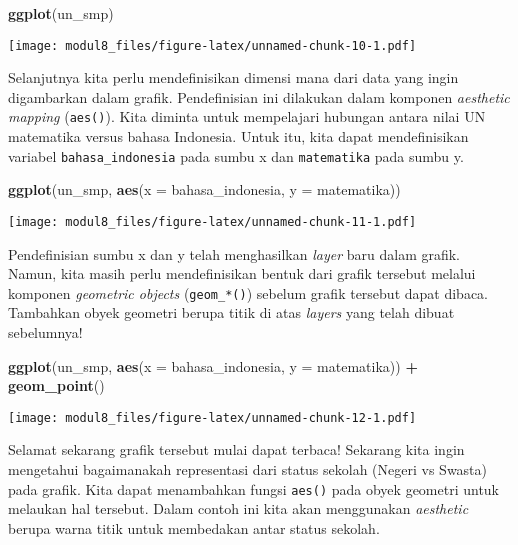 \documentclass[
]{article}
\newenvironment{Shaded}{\begin{snugshade}}{\end{snugshade}}
\newcommand{\DataTypeTok}[1]{\textcolor[rgb]{0.13,0.29,0.53}{#1}}
\newcommand{\KeywordTok}[1]{\textcolor[rgb]{0.13,0.29,0.53}{\textbf{#1}}}
\newcommand{\NormalTok}[1]{#1}
\newcommand{\OperatorTok}[1]{\textcolor[rgb]{0.81,0.36,0.00}{\textbf{#1}}}
\begin{document}
\begin{Shaded}
\begin{Highlighting}[]
\KeywordTok{ggplot}\NormalTok{(un_smp)}
\end{Highlighting}
\end{Shaded}

\texttt{[image: modul8\_files/figure-latex/unnamed-chunk-10-1.pdf]}

Selanjutnya kita perlu mendefinisikan dimensi mana dari data yang ingin
digambarkan dalam grafik. Pendefinisian ini dilakukan dalam komponen
\emph{aesthetic mapping} (\texttt{aes()}). Kita diminta untuk
mempelajari hubungan antara nilai UN matematika versus bahasa Indonesia.
Untuk itu, kita dapat mendefinisikan variabel \texttt{bahasa\_indonesia}
pada sumbu x dan \texttt{matematika} pada sumbu y.

\begin{Shaded}
\begin{Highlighting}[]
\KeywordTok{ggplot}\NormalTok{(un_smp, }\KeywordTok{aes}\NormalTok{(}\DataTypeTok{x =}\NormalTok{ bahasa_indonesia, }\DataTypeTok{y =}\NormalTok{ matematika))}
\end{Highlighting}
\end{Shaded}

\texttt{[image: modul8\_files/figure-latex/unnamed-chunk-11-1.pdf]}

Pendefinisian sumbu x dan y telah menghasilkan \emph{layer} baru dalam
grafik. Namun, kita masih perlu mendefinisikan bentuk dari grafik
tersebut melalui komponen \emph{geometric objects} (\texttt{geom\_*()})
sebelum grafik tersebut dapat dibaca. Tambahkan obyek geometri berupa
titik di atas \emph{layers} yang telah dibuat sebelumnya!

\begin{Shaded}
\begin{Highlighting}[]
\KeywordTok{ggplot}\NormalTok{(un_smp, }\KeywordTok{aes}\NormalTok{(}\DataTypeTok{x =}\NormalTok{ bahasa_indonesia, }\DataTypeTok{y =}\NormalTok{ matematika)) }\OperatorTok{+}
\KeywordTok{geom_point}\NormalTok{()}
\end{Highlighting}
\end{Shaded}

\texttt{[image: modul8\_files/figure-latex/unnamed-chunk-12-1.pdf]}

Selamat sekarang grafik tersebut mulai dapat terbaca! Sekarang kita
ingin mengetahui bagaimanakah representasi dari status sekolah (Negeri
vs Swasta) pada grafik. Kita dapat menambahkan fungsi \texttt{aes()}
pada obyek geometri untuk melaukan hal tersebut. Dalam contoh ini kita
akan menggunakan \emph{aesthetic} berupa warna titik untuk membedakan
antar status sekolah.
\end{document}
